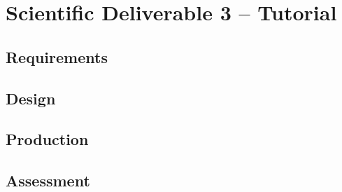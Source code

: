 \section{Scientific Deliverable 3 -- Tutorial}
% 
\subsection{Requirements}%

\subsection{Design}%

\subsection{Production}%

\subsection{Assessment}%

